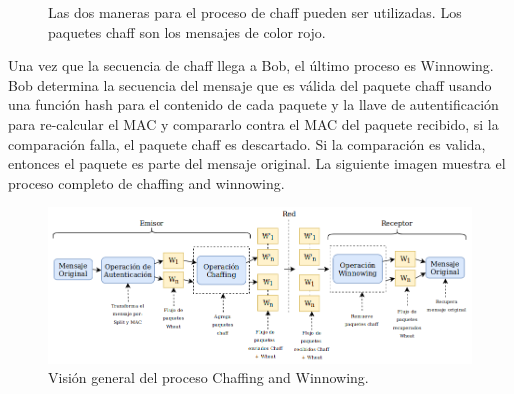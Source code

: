 \documentclass[12pt, a4paper, titlepage]{report}
\begin{document}
		\begin{figure}[H]
         \centering
         \caption{Las dos maneras para el proceso de chaff pueden ser utilizadas. Los paquetes chaff son los mensajes de color rojo.}
         \label{f:Enfoques}
        \end{figure}
		Una vez que la secuencia de chaff llega a Bob, el último proceso es Winnowing. Bob determina la secuencia del mensaje que es válida del paquete chaff usando una función hash para el contenido de cada paquete y la llave de autentificación para re-calcular el MAC y compararlo contra el MAC del paquete recibido, si la comparación falla, el paquete chaff es descartado. Si la comparaci\'on es valida, entonces el paquete es parte del mensaje original. La siguiente imagen muestra el proceso completo de chaffing and winnowing.
		\begin{figure}[H]
			\begin{center}	                  \includegraphics[width=14cm]{./imagenes/MarcoTeorico/chaff_winn.png}
				\caption{Visión general del proceso Chaffing and Winnowing.}
			\end{center}
		\end{figure}
        
\end{document}
